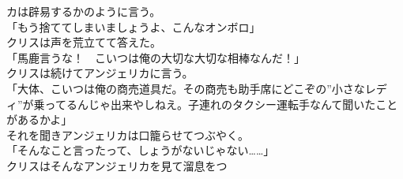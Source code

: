 \documentclass[b5j,10pt,openany]{jsbook}
\begin{document}
カは辟易するかのように言う。\\「もう捨ててしまいましょうよ、こんなオンボロ」\\クリスは声を荒立てて答えた。\\「馬鹿言うな！　こいつは俺の大切な大切な相棒なんだ！」\\クリスは続けてアンジェリカに言う。\\「大体、こいつは俺の商売道具だ。その商売も助手席にどこぞの''小さなレディ''が乗ってるんじゃ出来やしねえ。子連れのタクシー運転手なんて聞いたことがあるかよ」\\それを聞きアンジェリカは口籠らせてつぶやく。\\「そんなこと言ったって、しょうがないじゃない\ldots{}\ldots{}」\\クリスはそんなアンジェリカを見て溜息をつ
\end{document}
